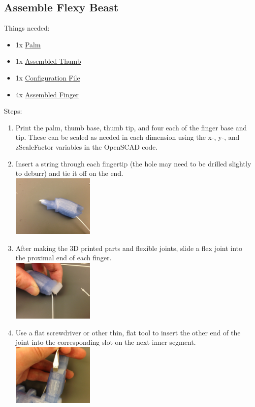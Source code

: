 \documentclass[11pt]{article}
\begin{document}
\subsection{Assemble Flexy Beast}
Things needed:
\begin{itemize}
\item 1x \hyperlink{thing_palm}{Palm}
\item 1x \hyperlink{thing_thumb\_assembly}{Assembled Thumb}
\item 1x \hyperlink{thing_config\_file}{Configuration File}
\item 4x \hyperlink{thing_finger\_assembly}{Assembled Finger}
\end{itemize}
Steps:
\begin{enumerate}
\item Print the palm, thumb base, thumb tip, and four each of the finger base and tip. These can be scaled as needed in each dimension using the x-, y-, and zScaleFactor variables in the OpenSCAD code.
\item Insert a string through each fingertip (the hole may need to be drilled slightly to deburr) and tie it off on the end.\\ \includegraphics[width=4cm]{images/hand_assembly/Fingertip with string.jpg}
\item After making the 3D printed parts and flexible joints, slide a flex joint into the proximal end of each finger.\\ \includegraphics[width=4cm]{images/hand_assembly/Inserting joint.jpg}
\item Use a flat screwdriver or other thin, flat tool to insert the other end of the joint into the corresponding slot on the next inner segment.\\ \includegraphics[width=4cm]{images/hand_assembly/Inserting joint with screwdriver.jpg}

\end{enumerate}
\end{document}
